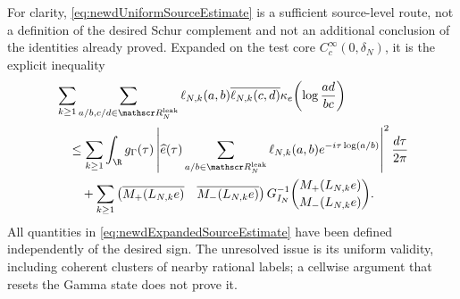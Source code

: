 For clarity, \eqref{eq:newdUniformSourceEstimate} is a sufficient
source-level route, not a definition of the desired Schur complement and not
an additional conclusion of the identities already proved.  Expanded on the
test core $C_c^\infty(0,\delta_N)$, it is the explicit inequality
\begin{align}
 &\sum_{k\geq1}
 \sum_{a/b,c/d\in\mathscr R_N^{\rm leak}}
 \ell_{N,k}(a,b)\overline{\ell_{N,k}(c,d)}
 \kappa_e\!\left(\log\frac{ad}{bc}\right)
 \notag\\
 &\quad\leq
 \sum_{k\geq1}\int_\R g_\Gamma(\tau)
 \left|\widehat e(\tau)
   \sum_{a/b\in\mathscr R_N^{\rm leak}}
       \ell_{N,k}(a,b)e^{-i\tau\log(a/b)}\right|^2
 \frac{d\tau}{2\pi}
 \notag\\
 &\qquad+
 \sum_{k\geq1}
 \begin{pmatrix}
  \overline{M_+(L_{N,k}e)}&\overline{M_-(L_{N,k}e)}
 \end{pmatrix}
 G_{I_N}^{-1}
 \binom{M_+(L_{N,k}e)}{M_-(L_{N,k}e)}.
 \label{eq:newdExpandedSourceEstimate}
\end{align}
All quantities in \eqref{eq:newdExpandedSourceEstimate} have been defined
independently of the desired sign.  The unresolved issue is its uniform
validity, including coherent clusters of nearby rational labels; a cellwise
argument that resets the Gamma state does not prove it.

\begin{center}
\end{center}
